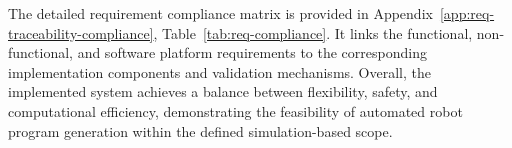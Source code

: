 The detailed requirement compliance matrix\label{sec:requirement-compliance} is provided in Appendix~\ref{app:req-traceability-compliance}, Table~\ref{tab:req-compliance}. It links the functional, non-functional, and software platform requirements to the corresponding implementation components and validation mechanisms. Overall, the implemented system achieves a balance between flexibility, safety, and computational efficiency, demonstrating the feasibility of automated robot program generation within the defined simulation-based scope.
